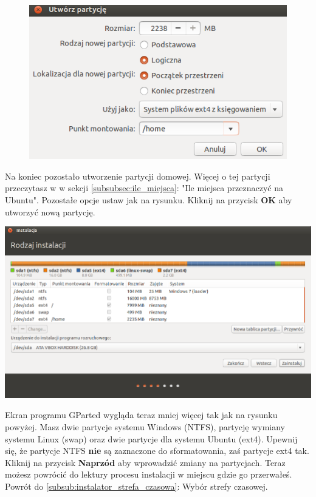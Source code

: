 \begin{figure}
                \includegraphics[scale=0.8]{images/instalator_partycjonowanie_gparted_dodaj_home.png}
\end{figure}
Na koniec pozostało utworzenie partycji domowej. Więcej o tej partycji przeczytasz w w sekcji \ref{subsubsec:ile_miejsca}: "Ile miejsca przeznaczyć na Ubuntu". Pozostałe opcje ustaw jak na rysunku. Kliknij na przycisk \textbf{OK} aby utworzyć nową partycję.
\clearpage
\begin{center}
        \includegraphics[scale=0.7]{images/instalator_partycjonowanie_gparted4.png}
\end{center}
Ekran programu GParted wygląda teraz mniej więcej tak jak na rysunku powyżej. Masz dwie partycje systemu Windows (NTFS), partycję wymiany systemu Linux (swap) oraz dwie partycje dla systemu Ubuntu (ext4). Upewnij się, że partycje NTFS \textbf{nie} są zaznaczone do sformatowania, zaś partycje ext4 tak. Kliknij na przycisk \textbf{Naprzód} aby wprowadzić zmiany na partycjach. Teraz możesz powrócić do lektury procesu instalacji w miejscu gdzie go przerwałeś.\\
Powrót do \ref{subsub:instalator_strefa_czasowa}: Wybór strefy czasowej.
\clearpage
